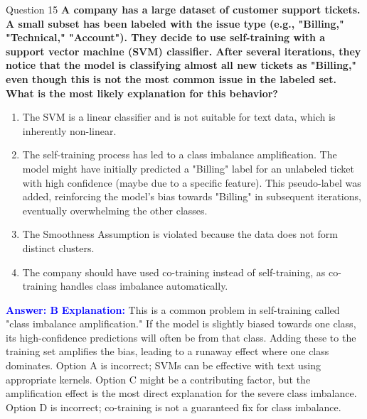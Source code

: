 \documentclass{beamer}
\begin{document}
	\begin{frame}{Question 15}
		\textbf{A company has a large dataset of customer support tickets. A small subset has been labeled with the issue type (e.g., "Billing," "Technical," "Account"). They decide to use self-training with a support vector machine (SVM) classifier. After several iterations, they notice that the model is classifying almost all new tickets as "Billing," even though this is not the most common issue in the labeled set. What is the most likely explanation for this behavior?}
		\begin{enumerate}
			\item The SVM is a linear classifier and is not suitable for text data, which is inherently non-linear.
			\item The self-training process has led to a class imbalance amplification. The model might have initially predicted a "Billing" label for an unlabeled ticket with high confidence (maybe due to a specific feature). This pseudo-label was added, reinforcing the model's bias towards "Billing" in subsequent iterations, eventually overwhelming the other classes.
			\item The Smoothness Assumption is violated because the data does not form distinct clusters.
			\item The company should have used co-training instead of self-training, as co-training handles class imbalance automatically.
		\end{enumerate}
		\vspace{0.2cm}
		\textcolor{blue}{\textbf{Answer: B}}
		\vspace{0.2cm}
		\textcolor{blue}{\textbf{Explanation:}} This is a common problem in self-training called "class imbalance amplification." If the model is slightly biased towards one class, its high-confidence predictions will often be from that class. Adding these to the training set amplifies the bias, leading to a runaway effect where one class dominates. Option A is incorrect; SVMs can be effective with text using appropriate kernels. Option C might be a contributing factor, but the amplification effect is the most direct explanation for the severe class imbalance. Option D is incorrect; co-training is not a guaranteed fix for class imbalance.
	\end{frame}
	
\end{document}
